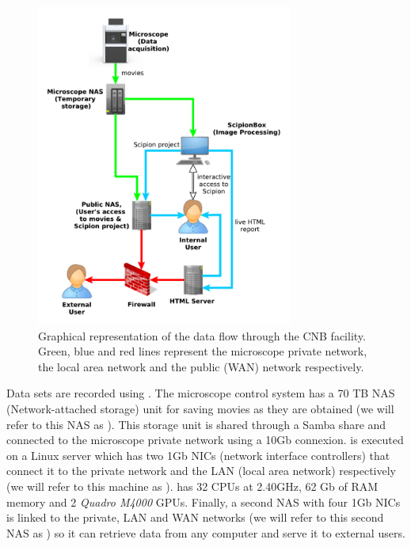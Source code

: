 \begin{figure}
  \centering
      \includegraphics[width=0.75\textwidth]{images/diagram.pdf}
  \caption{Graphical representation of the data flow through the CNB facility. Green, blue and red lines represent the microscope private network, the \cnb local area network and the public (WAN) network respectively.}
  \label{fig:cnbpipeline}

\end{figure}


Data sets are recorded using \epu. The microscope control system has a 70 TB NAS (Network-attached storage) unit for saving movies as they are obtained (we will refer to this NAS as \mnas). This storage unit is shared through a Samba share and connected to the microscope private network using a 10Gb connexion. \scipion is executed on a Linux server which has two 1Gb NICs (network interface controllers) that connect it to the private network and the LAN (local area network) respectively (we will refer to this machine as \scipionbox). \scipionbox has 32 CPUs at 2.40GHz, 62 Gb of RAM memory and 2 \textit{Quadro M4000} GPUs. Finally, a second NAS with four 1Gb NICs is linked to the private, LAN and WAN networks (we will refer to this second NAS as \onas) so it can retrieve data from any computer and serve it to external users.

